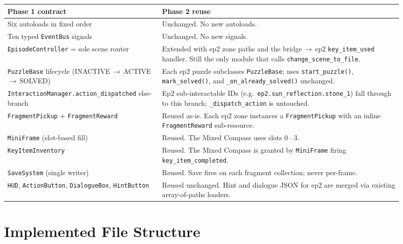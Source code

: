 \documentclass[12pt, a4paper]{article}
\begin{document}
\begin{center}
\begin{tabular}{p{0.36\linewidth} p{0.56\linewidth}}
\toprule
\textbf{Phase 1 contract} & \textbf{Phase 2 reuse} \\
\midrule
Six autoloads in fixed order             & Unchanged. No new autoloads. \\
Ten typed \texttt{EventBus} signals      & Unchanged. No new signals. \\
\texttt{EpisodeController} = sole scene router & Extended with ep2 zone paths and the bridge\,$\to$\,ep2 \texttt{key\_item\_used} handler. Still the only module that calls \texttt{change\_scene\_to\_file}. \\
\texttt{PuzzleBase} lifecycle (INACTIVE\,$\to$\,ACTIVE\,$\to$\,SOLVED) & Each ep2 puzzle subclasses \texttt{PuzzleBase}; uses \texttt{start\_puzzle()}, \texttt{mark\_solved()}, and \texttt{\_on\_already\_solved()} unchanged. \\
\texttt{InteractionManager.action\_dispatched} else-branch & Ep2 sub-interactable IDs (e.g.\ \texttt{ep2.sun\_reflection.stone\_1}) fall through to this branch; \texttt{\_dispatch\_action} is untouched. \\
\texttt{FragmentPickup} + \texttt{FragmentReward} & Reused as-is. Each ep2 zone instances a \texttt{FragmentPickup} with an inline \texttt{FragmentReward} sub-resource. \\
\texttt{MiniFrame} (slot-based fill)     & Reused. The Mixed Compass uses slots 0\,--\,3. \\
\texttt{KeyItemInventory}                & Reused. The Mixed Compass is granted by \texttt{MiniFrame} firing \texttt{key\_item\_completed}. \\
\texttt{SaveSystem} (single writer)      & Reused. Save fires on each fragment collection; never per-frame. \\
\texttt{HUD}, \texttt{ActionButton}, \texttt{DialogueBox}, \texttt{HintButton} & Reused unchanged. Hint and dialogue JSON for ep2 are merged via existing array-of-paths loaders. \\
\bottomrule
\end{tabular}
\end{center}

\section{Implemented File Structure}
\end{document}
